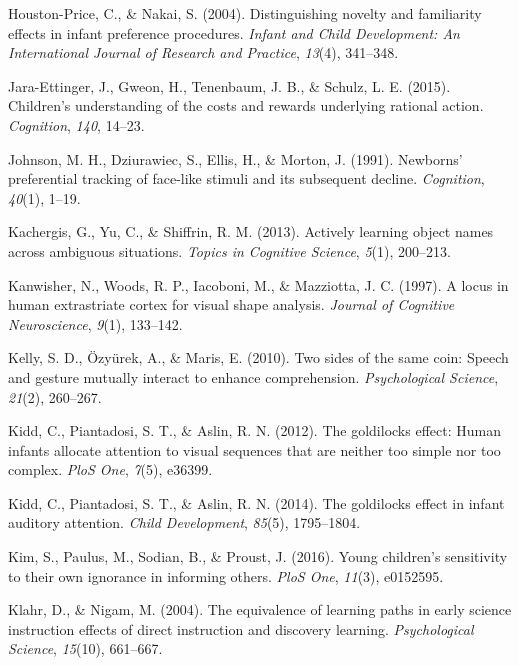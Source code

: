 \documentclass[oneside]{report}
\begin{document}
\hypertarget{ref-houston2004distinguishing}{}
Houston-Price, C., \& Nakai, S. (2004). Distinguishing novelty and
familiarity effects in infant preference procedures. \emph{Infant and
Child Development: An International Journal of Research and Practice},
\emph{13}(4), 341--348.

\hypertarget{ref-jara2015children}{}
Jara-Ettinger, J., Gweon, H., Tenenbaum, J. B., \& Schulz, L. E. (2015).
Children's understanding of the costs and rewards underlying rational
action. \emph{Cognition}, \emph{140}, 14--23.

\hypertarget{ref-johnson1991newborns}{}
Johnson, M. H., Dziurawiec, S., Ellis, H., \& Morton, J. (1991).
Newborns' preferential tracking of face-like stimuli and its subsequent
decline. \emph{Cognition}, \emph{40}(1), 1--19.

\hypertarget{ref-kachergis2013actively}{}
Kachergis, G., Yu, C., \& Shiffrin, R. M. (2013). Actively learning
object names across ambiguous situations. \emph{Topics in Cognitive
Science}, \emph{5}(1), 200--213.

\hypertarget{ref-kanwisher1997locus}{}
Kanwisher, N., Woods, R. P., Iacoboni, M., \& Mazziotta, J. C. (1997). A
locus in human extrastriate cortex for visual shape analysis.
\emph{Journal of Cognitive Neuroscience}, \emph{9}(1), 133--142.

\hypertarget{ref-kelly2010two}{}
Kelly, S. D., Özyürek, A., \& Maris, E. (2010). Two sides of the same
coin: Speech and gesture mutually interact to enhance comprehension.
\emph{Psychological Science}, \emph{21}(2), 260--267.

\hypertarget{ref-kidd2012goldilocks}{}
Kidd, C., Piantadosi, S. T., \& Aslin, R. N. (2012). The goldilocks
effect: Human infants allocate attention to visual sequences that are
neither too simple nor too complex. \emph{PloS One}, \emph{7}(5),
e36399.

\hypertarget{ref-kidd2014goldilocks}{}
Kidd, C., Piantadosi, S. T., \& Aslin, R. N. (2014). The goldilocks
effect in infant auditory attention. \emph{Child Development},
\emph{85}(5), 1795--1804.

\hypertarget{ref-kim2016young}{}
Kim, S., Paulus, M., Sodian, B., \& Proust, J. (2016). Young children's
sensitivity to their own ignorance in informing others. \emph{PloS One},
\emph{11}(3), e0152595.

\hypertarget{ref-klahr2004equivalence}{}
Klahr, D., \& Nigam, M. (2004). The equivalence of learning paths in
early science instruction effects of direct instruction and discovery
learning. \emph{Psychological Science}, \emph{15}(10), 661--667.
\end{document}
